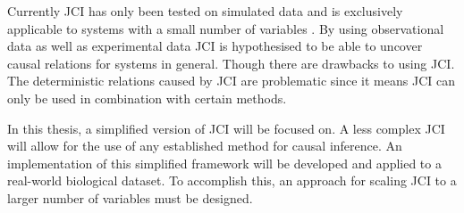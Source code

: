 \documentclass[11pt]{article}
\begin{document}
Currently JCI has only been tested on simulated data and is exclusively applicable to systems with a small number of variables \cite{jci}. By using observational data as well as experimental data JCI is hypothesised to be able to uncover causal relations for systems in general. Though there are drawbacks to using JCI. The deterministic relations caused by JCI are problematic since it means JCI can only be used in combination with certain methods.

In this thesis, a simplified version of JCI will be focused on. A less complex JCI will allow for the use of any established method for causal inference. An implementation of this simplified framework will be developed and applied to a real-world biological dataset. To accomplish this, an approach for scaling JCI to a larger number of variables must be designed.



 
\end{document}
